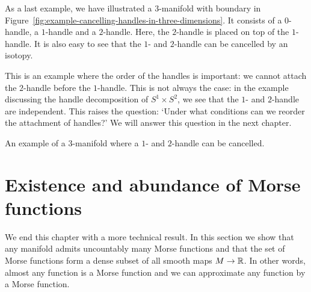 \begin{eg}
    \label{eg:cancel-three}
    As a last example, we have illustrated a $3$-manifold with boundary in Figure~\ref{fig:example-cancelling-handles-in-three-dimensions}.
    It consists of a $0$-handle, a $1$-handle and a $2$-handle.
    Here, the $2$-handle is placed on top of the $1$-handle.
    It is also easy to see that the $1$- and $2$-handle can be cancelled by an isotopy.

    This is an example where the order of the handles is important: we cannot attach the $2$-handle before the $1$-handle.
    This is not always the case: in the example discussing the handle decomposition of $ S^1 \times S^2$, we see that the $1$- and  $2$-handle are independent.
    This raises the question: `Under what conditions can we reorder the attachment of handles?' We will answer this question in the next chapter.

    \begin{marginfigure}
    \centering
    \caption{An example of a $3$-manifold where a $1$- and $2$-handle can be cancelled.}
    \label{fig:example-cancelling-handles-in-three-dimensions}
\end{marginfigure}
\end{eg}





\section{Existence and abundance of Morse functions}
We end this chapter with a more technical result.
In this section we show that any manifold admits uncountably many Morse functions and that the set of Morse functions form a dense subset of all smooth maps $M \to  \mathbb{R}$.
In other words, almost any function is a Morse function and we can approximate any function by a Morse function.

